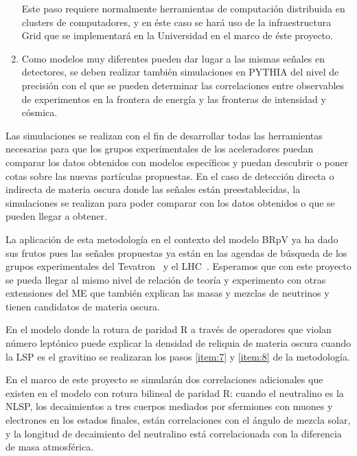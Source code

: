 \begin{enumerate}
  Este paso requiere normalmente herramientas de computación
  distribuida en clusters de computadores, y en éste caso se hará uso
  de la infraestructura Grid que se implementará en la Universidad en
  el marco de éste proyecto.
  \label{item:8}
\item Como modelos muy diferentes pueden dar lugar a las mismas
  señales en detectores, se deben realizar también simulaciones en
  PYTHIA del nivel de precisión con el que se pueden determinar las
  correlaciones entre observables de experimentos en la frontera de
  energía y las fronteras de intensidad y cósmica.
  \label{item:9}
\end{enumerate}

Las simulaciones se realizan con el fin de desarrollar todas las
herramientas necesarias para que los grupos experimentales de los
aceleradores puedan comparar los datos obtenidos con modelos
específicos y puedan descubrir o poner cotas sobre las nuevas
partículas propuestas. En el caso de detección directa o indirecta de
materia oscura donde las señales están preestablecidas, la
simulaciones se realizan para poder comparar con los datos obtenidos o
que se pueden llegar a obtener. 

La aplicación de esta metodología en el contexto del modelo BRpV ya ha
dado sus frutos pues las señales propuestas ya están en las agendas de
búsqueda de los grupos experimentales del
Tevatron~\cite{Brigliadori:2008vf} y el LHC~\cite{:2011iu}. Esperamos
que con este proyecto se pueda llegar al mismo nivel de relación de
teoría y experimento con otras extensiones del ME que también explican
las masas y mezclas de neutrinos y tienen candidatos de materia
oscura.



\begin{gravitinodm}
  En el modelo donde la rotura de paridad R a través de operadores
  que violan número leptónico puede explicar la densidad de reliquia
  de materia oscura cuando la LSP es el gravitino se realizaran los
  pasos \ref{item:7} y \ref{item:8} de la metodología.
\end{gravitinodm}

\begin{brpvlhc}
  En el marco de este proyecto se simularán dos correlaciones
  adicionales que existen en el modelo con rotura bilineal de paridad R:
  cuando el neutralino es la NLSP, los decaimientos a tres cuerpos
  mediados por sfermiones con muones y electrones en los estados
  finales, están correlaciones con el ángulo de mezcla solar, y la
  longitud de decaimiento del neutralino está correlacionada con la
  diferencia de masa atmosférica.
\end{brpvlhc}


